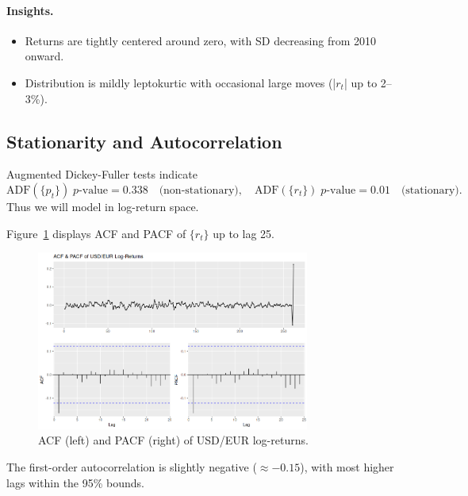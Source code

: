 \documentclass[11pt,a4paper]{article}
\begin{document}
    \paragraph{Insights.}
    \begin{itemize}
    \item Returns are tightly centered around zero, with SD decreasing from 2010 onward.
    \item Distribution is mildly leptokurtic with occasional large moves (|\(r_t\)| up to 2–3\%).
    \end{itemize}

    \subsection{Stationarity and Autocorrelation}
    Augmented Dickey-Fuller tests indicate
    \[
    \text{ADF}(\{p_t\})\;p\text{-value}=0.338
    \quad\text{(non-stationary)}, 
    \quad
    \text{ADF}(\{r_t\})\;p\text{-value}=0.01
    \quad\text{(stationary).}
    \]
    Thus we will model in log-return space.

    Figure~\ref{fig:acf_pacf} displays ACF and PACF of \(\{r_t\}\) up to lag 25.

    \begin{figure}[H]
    \centering
    \includegraphics[width=0.8\textwidth]{figures/usdeur_acf_pacf.png}
    \caption{ACF (left) and PACF (right) of USD/EUR log-returns.}
    \label{fig:acf_pacf}
    \end{figure}

    The first-order autocorrelation is slightly negative (\(\approx -0.15\)), with most higher lags within the 95\% bounds.
\end{document}
